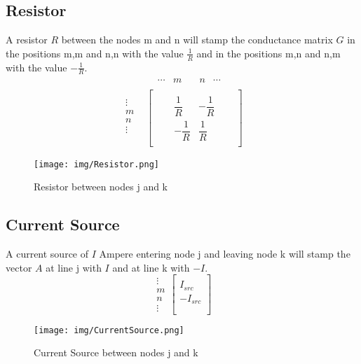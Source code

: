 \subsection{Resistor} \label{ResistorMatrixStamp}
A resistor $R$ between the nodes m and n will stamp the conductance matrix $G$ in the positions m,m and n,n with the value $\frac{1}{R} $ and in the positions m,n and n,m with the value $-\frac{1}{R}$.
\begin{equation}
\begin{split}
&
\begin{matrix}
& \cdots & m & \quad n & \cdots
\end{matrix}\\[-5pt]
\begin{matrix}
\vdots\\[6pt]
m\\[6pt]
n\\[6pt]
\vdots\\
\end{matrix}
&
\begin{bmatrix}
	\quad & \quad &  \\[6pt]
	\quad & \dfrac{1}{R} & -\dfrac{1}{R} & \quad \\[6pt]
	\quad & -\dfrac{1}{R} & \dfrac{1}{R} & \quad \\[6pt]
	\quad &  & 
\end{bmatrix}
\end{split}
\end{equation}
%
\begin{figure}[h]
	\centering
	\texttt{[image: img/Resistor.png]}
	\caption{Resistor between nodes j and k}
	\label{fig:Resistor}
\end{figure}

\subsection{Current Source} \label{CurrentSourceMatrixStamp}
A current source of $I$ Ampere entering node j and leaving node k will stamp the vector $A$ at line j with $I$ and at line k with $-I$.
\begin{equation}
\begin{matrix}
	\vdots\\
	m\\[6pt]
	n\\
	\vdots
\end{matrix}
\begin{bmatrix}
	\\
	I_{src} \\[6pt]
	-I_{src} \\
	\\
\end{bmatrix}
\end{equation}
%
\begin{figure}[h]
	\centering
	\texttt{[image: img/CurrentSource.png]}
	\caption{Current Source between nodes j and k}
	\label{fig:CurrentSource}
\end{figure}

